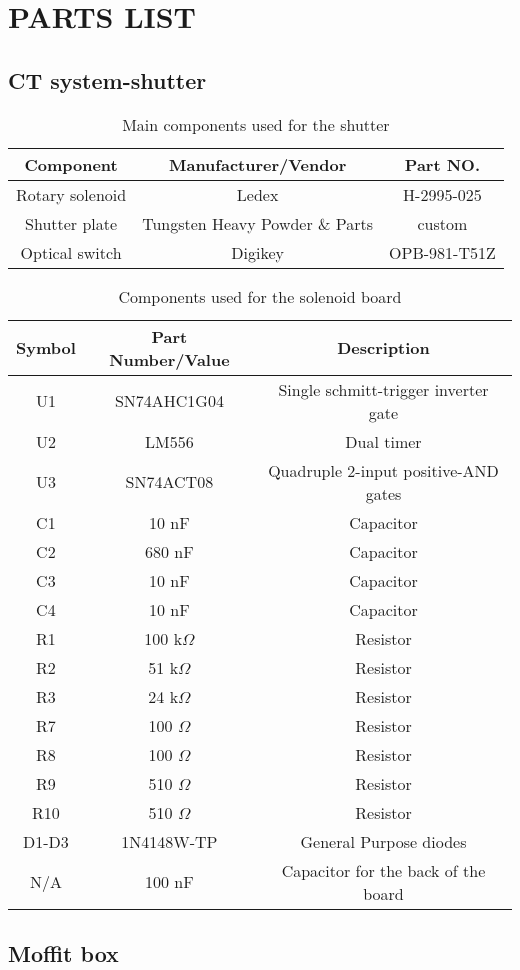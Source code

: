 \chapter{PARTS LIST}\label{app:partslist}


\section{CT system-shutter}

\begin{table}[h]
\begin{tabular}{c|c|c}
\hline
\textbf{Component} & \textbf{Manufacturer/Vendor} & \textbf{Part NO.} \\ \hline \hline
Rotary solenoid & Ledex & H-2995-025 \\ \hline
Shutter plate & Tungsten Heavy Powder \& Parts & custom \\ \hline
Optical switch & Digikey & OPB-981-T51Z \\ \hline
\end{tabular}
\caption{Main components used for the shutter}
\label{table:shutter_components}
\end{table}

\begin{table}[h]
\begin{tabular}{c|c|c}
\hline
\textbf{Symbol} & \textbf{Part Number/Value} & \textbf{Description} \\
\hline
U1 & SN74AHC1G04 & Single schmitt-trigger inverter gate \\ \hline
U2 & LM556 & Dual timer \\ \hline
U3 & SN74ACT08 & Quadruple 2-input positive-AND gates \\ \hline
C1 & 10 nF & Capacitor \\ \hline
C2 & 680 nF & Capacitor \\ \hline
C3 & 10 nF & Capacitor \\ \hline
C4 & 10 nF & Capacitor \\ \hline
R1 & 100 k$\Omega$ & Resistor \\ \hline
R2 & 51 k$\Omega$ & Resistor \\ \hline
R3 & 24 k$\Omega$ & Resistor \\ \hline
R7 & 100 $\Omega$ & Resistor \\ \hline
R8 & 100 $\Omega$ & Resistor \\ \hline
R9 & 510 $\Omega$ & Resistor \\ \hline
R10 & 510 $\Omega$ & Resistor \\ \hline
D1-D3 & 1N4148W-TP & General Purpose diodes\\ \hline
N/A & 100 nF & Capacitor for the back of the board\\ \hline
\end{tabular}
\caption{Components used for the solenoid board}
\label{table:solenoid_components}
\end{table}

\section{Moffit box}


